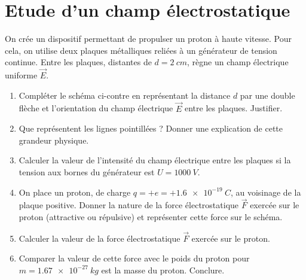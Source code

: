 \documentclass[a4paper,fontsize=14pt,fleqn]{scrartcl}%
\begin{document}
\maketitle

\section{Etude d'un champ électrostatique}

On crée un dispositif permettant de propulser un proton à haute vitesse. Pour cela, on utilise deux plaques métalliques reliées à un générateur de tension continue. Entre les plaques, distantes de $d=\SI{2}{cm}$, règne un champ électrique uniforme $\vec{E}$.\\


\noindent \begin{minipage}{.49\linewidth}
    \centering
\end{minipage}
\begin{minipage}{.49\linewidth}
    \begin{enumerate}
        \item Compléter le schéma ci-contre en  représentant la distance $d$ par une double flèche et l'orientation du champ électrique $\vec{E}$ entre les plaques. Justifier.
        \item Que représentent les lignes pointillées ? Donner une explication de cette grandeur physique.
        \item Calculer la valeur de l'intensité du champ électrique entre les plaques si la tension aux bornes du générateur est $U=\SI{1000}{V}$.
    \end{enumerate}
\end{minipage}
\begin{enumerate}
    \setcounter{enumi}{3}
    \item On place un proton, de charge $q=+e=+\SI{1.6e-19}{C}$, au voisinage de la plaque positive. Donner la nature de la force électrostatique $\vec{F}$ exercée sur le proton (attractive ou répulsive) et représenter cette force sur le schéma.
    \item Calculer la valeur de la force électrostatique $\vec{F}$ exercée sur le proton.
    \item Comparer la valeur de cette force avec le poids du proton pour $m=\SI{1.67e-27}{kg}$ est la masse du proton. Conclure.
\end{enumerate}
\end{document}
